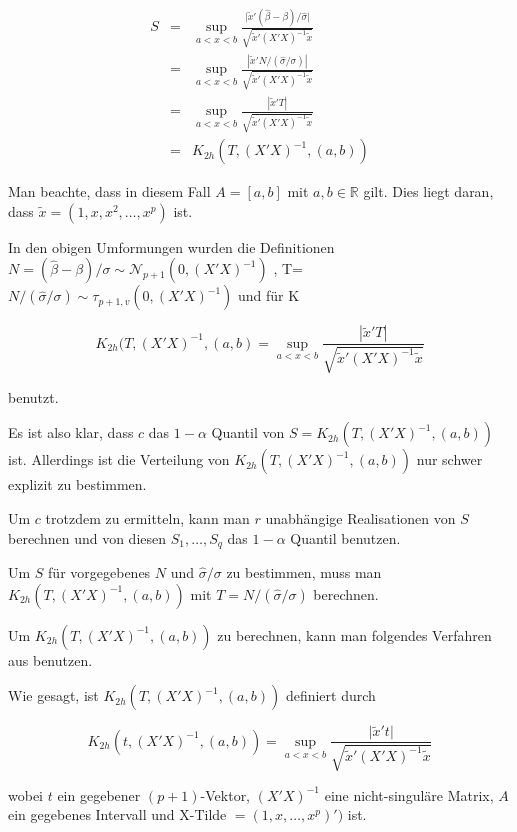 \documentclass[12pt,a4paper]{article}
\theoremstyle{definition}
\theoremstyle{definition}
\theoremstyle{definition}
\theoremstyle{definition}
\begin{document}
\begin{eqnarray*}
S &=& \sup_{a<x<b} \frac{\vert \tilde{x}'(\hat{\beta}-\beta) /\hat{\sigma} \vert}{\sqrt{\tilde{x}'(X'X)^{-1}\tilde{x}}} \\
&=& \sup_{a<x<b} \frac{|\tilde{x}'N/(\hat{\sigma}/\sigma)|}{\sqrt{\tilde{x}'(X'X)^{-1}\tilde{x}}} \\
&=& \sup_{a<x<b} \frac{| \tilde{x}'T |}{\sqrt{\tilde{x}'(X'X)^{-1}\tilde{x}}} \\
&=& K_{2h}(T,(X'X)^{-1},(a,b))
\end{eqnarray*}

Man beachte, dass in diesem Fall $A=[a,b]$ mit $a,b \in \mathbb{R}$ gilt. Dies liegt daran, dass $\tilde{x} = (1, x, x^2, \ldots, x^p)$ ist.

In den obigen Umformungen wurden die Definitionen $ N=(\hat{\beta}-\beta)/\sigma \sim \mathscr{N}_{p+1
} (0,(X'X)^{-1}) $ , \gls{T}=$N/(\hat{\sigma}/\sigma)\sim\tau_{p+1,v}(0,(X'X)^{-1}) $ und für \gls{K}

\begin{equation*}
K_{2h}(T,(X'X)^{-1},(a,b) = \sup_{a<x<b} \frac{|\tilde{x}'T|}{\sqrt{\tilde{x}'(X'X)^{-1}\tilde{x}}}
\end{equation*}

benutzt.

Es ist also klar, dass $c$ das $1-\alpha$ Quantil von $S = K_{2h}(T,(X'X)^{-1},(a,b))$ ist. Allerdings ist die Verteilung von $K_{2h}(T,(X'X)^{-1},(a,b))$ nur schwer explizit zu bestimmen.

Um $c$ trotzdem zu ermitteln, kann man $r$ unabhängige Realisationen von $S$ berechnen und von diesen $S_1, \ldots, S_q$ das $1-\alpha$ Quantil benutzen.

Um $S$ für vorgegebenes $N$ und $\hat{\sigma}/\sigma$ zu bestimmen, muss man $K_{2h}(T,(X'X)^{-1},(a,b))$ mit $T=N/(\hat{\sigma}/\sigma)$ berechnen. 

Um  $K_{2h}(T,(X'X)^{-1},(a,b))$ zu berechnen, kann man folgendes Verfahren aus \cite[Appendix E]{Liu64}  benutzen.

Wie gesagt, ist $K_{2h}(T,(X'X)^{-1},(a,b))$ definiert durch

\begin{equation*}
K_{2h}(t,(X'X)^{-1},(a,b)) = \sup_{a<x<b} \frac{\vert \tilde{x}' t \vert}{\sqrt{\tilde{x}'(X'X)^{-1}\tilde{x}}}
\end{equation*}

wobei $t$ ein gegebener $(p+1)$-Vektor, $(X'X)^{-1}$ eine nicht-singuläre Matrix, $A$ ein gegebenes Intervall und \gls{X-Tilde} $= (1, x, \ldots, x^p)')$ ist. 
\end{document}
